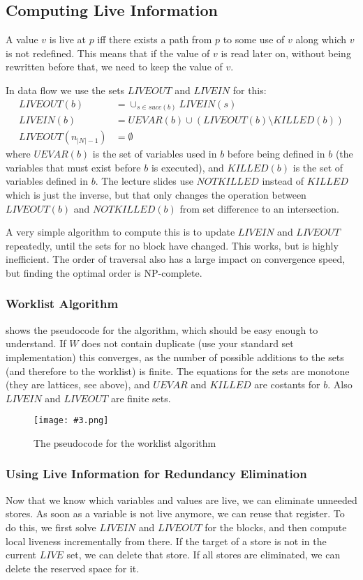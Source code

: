 \documentclass{article}
\newcommand{\fig}[4]{
	\begin{figure}[#1]
		\center
		\texttt{[image: \#3.png]}
		\caption{#4}
		\label{fig:#3}
	\end{figure}
	}
\begin{document}
\subsection{Computing Live Information}
A value $v$ is live at $p$ iff there exists a path from $p$ to some use of $v$ along which $v$ is not redefined.
This means that if the value of $v$ is read later on, without being rewritten before that, we need to keep the value of $v$.

In data flow we use the sets $LIVEOUT$ and $LIVEIN$ for this:
\begin{align}
	LIVEOUT(b) &= \cup_{s \in succ(b)} LIVEIN(s)\\
	LIVEIN(b) &= UEVAR(b) \cup (LIVEOUT(b) \setminus KILLED(b))\\
	LIVEOUT(n_{|N|-1}) &= \emptyset
\end{align}
where $UEVAR(b)$ is the set of variables used in $b$ before being defined in $b$ (the variables that must exist before $b$ is executed), and $KILLED(b)$ is the set of variables defined in $b$.
The lecture slides use $NOTKILLED$ instead of $KILLED$ which is just the inverse, but that only changes the operation between $LIVEOUT(b)$ and $NOTKILLED(b)$ from set difference to an intersection.

A very simple algorithm to compute this is to update $LIVEIN$ and $LIVEOUT$ repeatedly, until the sets for no block have changed.
This works, but is highly inefficient.
The order of traversal also has a large impact on convergence speed, but finding the optimal order is NP-complete.

\subsubsection{Worklist Algorithm}
 shows the pseudocode for the algorithm, which should be easy enough to understand.
If $W$ does not contain duplicate (use your standard set implementation) this converges, as the number of possible additions to the sets (and therefore to the worklist) is finite.
The equations for the sets are monotone (they are lattices, see above), and $UEVAR$ and $KILLED$ are costants for $b$.
Also $LIVEIN$ and $LIVEOUT$ are finite sets.

\fig{h}{0.6}{worklist}{The pseudocode for the worklist algorithm}

\subsubsection{Using Live Information for Redundancy Elimination}
Now that we know which variables and values are live, we can eliminate unneeded stores.
As soon as a variable is not live anymore, we can reuse that register.
To do this, we first solve $LIVEIN$ and $LIVEOUT$ for the blocks, and then compute local liveness incrementally from there.
If the target of a store is not in the current $LIVE$ set, we can delete that store.
If all stores are eliminated, we can delete the reserved space for it.
\end{document}
